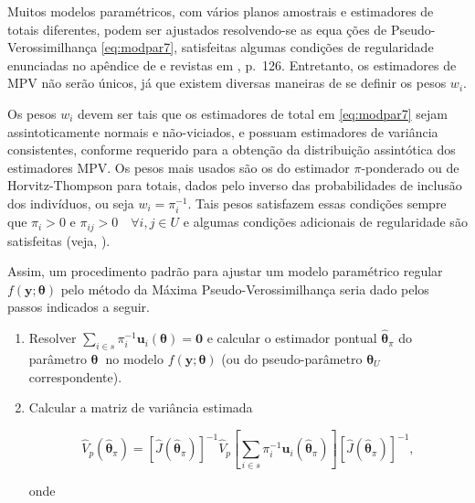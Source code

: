 \documentclass[]{book}
\numberwithin{example}{chapter}
\numberwithin{remark}{chapter}
\numberwithin{definition}{chapter}
\begin{document}
Muitos modelos paramétricos, com vários planos amostrais e estimadores
de totais diferentes, podem ser ajustados resolvendo-se as equa ções de
Pseudo-Verossimilhança \eqref{eq:modpar7}, satisfeitas algumas condições
de regularidade enunciadas no apêndice de \citep{binder83} e revistas em
\citep{Silva}, p.~126. Entretanto, os estimadores de MPV não serão
únicos, já que existem diversas maneiras de se definir os pesos
\(w_{i}\).

Os pesos \(w_{i}\) devem ser tais que os estimadores de total em
\eqref{eq:modpar7} sejam assintoticamente normais e não-viciados, e
possuam estimadores de variância consistentes, conforme requerido para a
obtenção da distribuição assintótica dos estimadores MPV. Os pesos mais
usados são os do estimador \(\pi\)-ponderado ou de Horvitz-Thompson para
totais, dados pelo inverso das probabilidades de inclusão dos
indivíduos, ou seja \(w_{i}=\pi _{i}^{-1}\). Tais pesos satisfazem essas
condições sempre que \(\pi _{i}>0\) e
\(\pi _{ij}>0\quad \forall i,j\in U\) e algumas condições adicionais de
regularidade são satisfeitas (veja, \citep{fuller84}).

Assim, um procedimento padrão para ajustar um modelo paramétrico regular
\(f\left( \mathbf{y};\mathbf{\theta }\right)\) pelo método da Máxima
Pseudo-Verossimilhança seria dado pelos passos indicados a seguir.

\begin{enumerate}
\def\labelenumi{\arabic{enumi}.}
\item
  Resolver
  \(\sum\limits_{i\in s}\pi _{i}^{-1}\mathbf{u}_{i}\left( \mathbf{\theta }\right) =\mathbf{0}\)
  e calcular o estimador pontual \(\mathbf{ \hat{\theta}}_{\pi }\) do
  parâmetro \(\mathbf{\theta }\)\textbf{\ }no modelo
  \(f\left( \mathbf{y;\theta }\right)\) (ou do pseudo-parâmetro
  \(\mathbf{\theta }_{U}\) correspondente).
\item
  Calcular a matriz de variância estimada

  \begin{equation}
  \hat{V}_{p}\left( \mathbf{\hat{\theta}}_{\pi }\right) =\left[ \hat{J}\left( 
  \mathbf{\hat{\theta}}_{\pi }\right) \right] ^{-1}\hat{V}_{p}\left[
  \sum\limits_{i\in s}\pi _{i}^{-1}\mathbf{u}_{i}\left( \mathbf{\hat{\theta}}
  _{\pi }\right) \right] \left[ \hat{J}\left( \mathbf{\hat{\theta}}_{\pi
  }\right) \right] ^{-1},  
  \label{eq:modpar13}
  \end{equation}

  onde
\end{enumerate}
\end{document}
